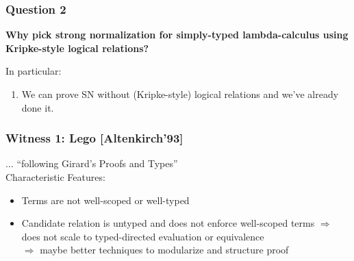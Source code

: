 \begin{frame}\frametitle{Question 2}%
\vspace{4em}
\begin{center}
\LARGE\textbf
{Why pick strong normalization for simply-typed lambda-calculus using
Kripke-style
logical relations?}
\end{center}

\pause
In particular:
\begin{enumerate}
\item We can prove SN without (Kripke-style) logical relations and we've already done it.
\end{enumerate}

\end{frame}

\begin{frame}\frametitle{Witness 1: Lego [Altenkirch'93]}

$\ldots$ ``following Girard's Proofs and Types''
\\[1em]
Characteristic Features:
  \begin{itemize}
    \item Terms are not well-scoped or well-typed
    \item Candidate relation is untyped and does not enforce
      well-scoped terms
$\Longrightarrow$ does not scale to typed-directed evaluation or equivalence\\
$\Longrightarrow$ maybe better techniques to modularize and structure proof
  \end{itemize}

\end{frame}



